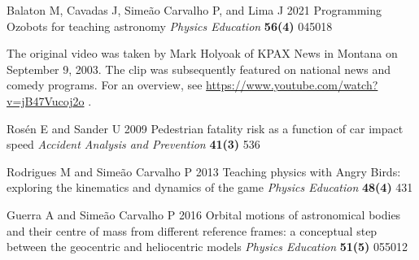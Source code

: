 \documentclass[12pt]{iopart}
\begin{document}
\begin{thebibliography}{99}
Balaton M, Cavadas J, Simeão Carvalho P, and Lima J
2021
Programming Ozobots for teaching astronomy
{\it Physics Education}
\textbf{56(4)}
045018

The original video was taken by Mark Holyoak of KPAX News in Montana on September 9, 2003.  The clip was subsequently featured on national news and comedy programs.  For an overview, see \url{https://www.youtube.com/watch?v=jB47Vucoj2o} .
   
Rosén E and Sander U
2009
Pedestrian fatality risk as a function of car impact speed
{\it Accident Analysis and Prevention}
\textbf{41(3)} 
536

Rodrigues M and Simeão Carvalho P 
2013
Teaching physics with Angry Birds: exploring the kinematics and dynamics of the game
{\it Physics Education}
\textbf{48(4)}
431

Guerra A and Simeão Carvalho P
2016
Orbital motions of astronomical bodies and their centre of mass from different reference frames: a conceptual step between the geocentric and heliocentric models
{\it Physics Education}
\textbf{51(5)}
055012

\end{thebibliography}
\end{document}
